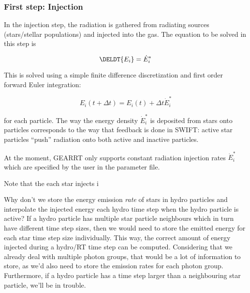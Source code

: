 \subsubsection{First step: Injection} \label{chap:injection-step}


In the injection step, the radiation is gathered from radiating sources
(stars/stellar populations) and injected into the gas.
The equation to be solved in this step is

\begin{equation}
		\DELDT{E_i} = \dot{E}_i^* \label{eq:solve-dEdt}
\end{equation}


This is solved using a simple finite difference discretization and first order
forward Euler integration:

\begin{equation}
    E_i(t + \Delta t) = E_i(t) + \Delta t \dot{E}_i^*
\end{equation}

for each particle. The way the energy density $\dot{E}_i^*$ is deposited from
stars onto particles corresponds to the way that feedback is done in SWIFT:
active star particles ``push'' radiation onto both active and inactive particles.

At the moment, GEARRT only supports constant radiation injection rates $\dot{E}_i^*$
which are specified by the user in the parameter file.


Note that the each star injects i

Why don't we store the energy emission \emph{rate} of stars in hydro particles and interpolate the
injected energy each hydro time step when the hydro particle is active? If a hydro particle has
multiple star particle neighbours which in turn have different time step sizes, then we would need
to store the emitted energy for each star time step size individually. This way, the correct amount
of energy injected during a hydro/RT time step can be computed. Considering that we already deal
with multiple photon groups, that would be a lot of information to store, as we'd also need to
store the emission rates for each photon group. Furthermore, if a hydro particle has a time step
larger than a neighbouring star particle, we'll be in trouble.



